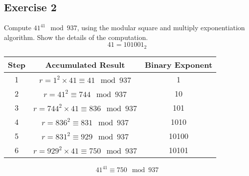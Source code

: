 \documentclass{math}
\begin{document}
\subsection*{Exercise 2}
Compute \( 41^{41}\mod937 \), using the modular square and multiply
exponentiation algorithm. Show the details of the computation.
\[ 41 = 101001_2 \]
\begin{center}
  \begin{tabular}{|c|c|c|}
    \hline
    Step & Accumulated Result & Binary Exponent \\
    \hline
    1 & \( r = 1^2\times41 \equiv 41\mod937 \) & 1 \\
    \hline
    2 & \( r = 41^2 \equiv 744\mod937 \) & 10 \\
    \hline
    3 & \( r = 744^2\times41 \equiv 836\mod937 \) & 101 \\
    \hline
    4 & \( r = 836^2 \equiv 831\mod937 \) & 1010 \\
    \hline
    5 & \( r = 831^2 \equiv 929\mod937 \) & 10100 \\
    \hline
    6 & \( r = 929^2\times41 \equiv 750\mod937 \) & 10101 \\
    \hline
  \end{tabular}
\end{center}
\[ 41^{41} \equiv 750\mod937 \]
\end{document}
